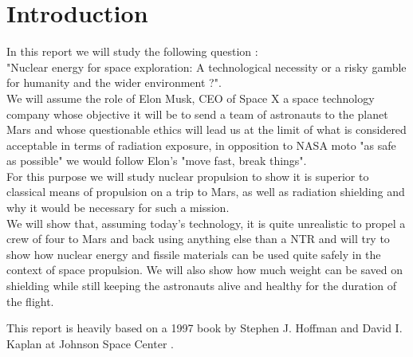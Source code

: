 \documentclass[12pt,a4paper]{report}
\author{S. Bourgeois}
\begin{document}


\pagestyle{fancy}

\fancyhead{} %
\fancyfoot{} %





\tableofcontents


\chapter*{Introduction}


\quad In this report we will study the following question : \\
"Nuclear energy for space exploration: A technological necessity or a risky gamble for humanity and the wider environment ?".\\

We will assume the role of Elon Musk, CEO of Space X a space technology company whose objective it will be to send a team of astronauts to the planet Mars and whose questionable ethics will lead us at the limit of what is considered acceptable in terms of radiation exposure, in opposition to NASA moto "as safe as possible" we would follow Elon's "move fast, break things".\\
For this purpose we will study nuclear propulsion to show it is superior to classical means of propulsion on a trip to Mars, as well as radiation shielding and why it would be necessary for such a mission.\\

We will show that, assuming today's technology, it is quite unrealistic to propel a crew of four to Mars and back using anything else than a NTR and will try to show how nuclear energy and fissile materials can be used quite safely in the context of space propulsion. We will also show how much weight can be saved on shielding while still keeping the astronauts alive and healthy for the duration of the flight.

This report is heavily based on a 1997 book by Stephen J. Hoffman and David I. Kaplan at Johnson Space Center \cite{Hoffman1997}.
\end{document}
